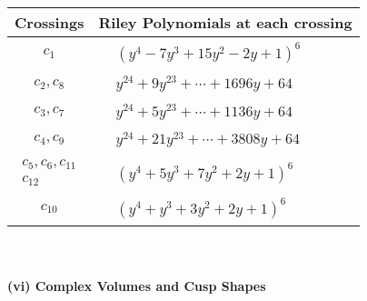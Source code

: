 \documentclass[1p]{elsarticle_modified}
\theoremstyle{definition}
\begin{document}
\begin{tabular}{m{50pt}|m{274pt}}
Crossings & \hspace{64pt}Riley Polynomials at each crossing \\
\hline $$\begin{aligned}c_{1}\end{aligned}$$&$\begin{aligned}
&(y^4-7 y^3+15 y^2-2 y+1)^6
\end{aligned}$\\
\hline $$\begin{aligned}c_{2},c_{8}\end{aligned}$$&$\begin{aligned}
&y^{24}+9 y^{23}+\cdots+1696 y+64
\end{aligned}$\\
\hline $$\begin{aligned}c_{3},c_{7}\end{aligned}$$&$\begin{aligned}
&y^{24}+5 y^{23}+\cdots+1136 y+64
\end{aligned}$\\
\hline $$\begin{aligned}c_{4},c_{9}\end{aligned}$$&$\begin{aligned}
&y^{24}+21 y^{23}+\cdots+3808 y+64
\end{aligned}$\\
\hline $$\begin{aligned}c_{5},c_{6},c_{11}\\c_{12}\end{aligned}$$&$\begin{aligned}
&(y^4+5 y^3+7 y^2+2 y+1)^6
\end{aligned}$\\
\hline $$\begin{aligned}c_{10}\end{aligned}$$&$\begin{aligned}
&(y^4+y^3+3 y^2+2 y+1)^6
\end{aligned}$\\
\hline
\end{tabular}\\~\\
\newpage\flushleft \textbf{(vi) Complex Volumes and Cusp Shapes}
\end{document}
